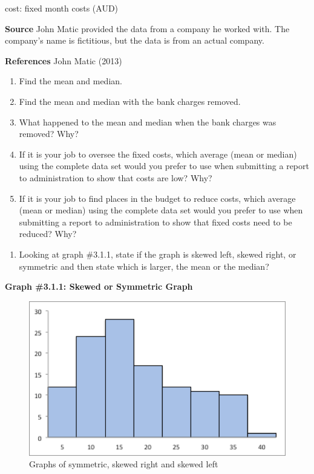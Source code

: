 \documentclass[
]{book}
\providecommand{\tightlist}{%
  \setlength{\itemsep}{0pt}\setlength{\parskip}{0pt}}
\begin{document}
cost: fixed month costs (AUD)

\textbf{Source}
John Matic provided the data from a company he worked with. The company's name is fictitious, but the data is from an actual company.

\textbf{References}
John Matic (2013)

\begin{enumerate}
\def\labelenumi{\alph{enumi}.}
\item
  Find the mean and median.
\item
  Find the mean and median with the bank charges removed.
\item
  What happened to the mean and median when the bank charges was removed? Why?
\item
  If it is your job to oversee the fixed costs, which average (mean or median) using the complete data set would you prefer to use when submitting a report to administration to show that costs are low? Why?
\item
  If it is your job to find places in the budget to reduce costs, which average (mean or median) using the complete data set would you prefer to use when submitting a report to administration to show that fixed costs need to be reduced? Why?
\end{enumerate}

\begin{enumerate}
\def\labelenumi{\arabic{enumi}.}
\setcounter{enumi}{4}
\tightlist
\item
  Looking at graph \#3.1.1, state if the graph is skewed left, skewed right, or symmetric and then state which is larger, the mean or the median?
\end{enumerate}

\textbf{Graph \#3.1.1: Skewed or Symmetric Graph}

\begin{figure}
\centering
\includegraphics{graph_3_1_1.png}
\caption{Graphs of symmetric, skewed right and skewed left}
\end{figure}
\end{document}
